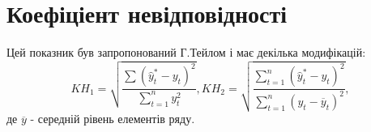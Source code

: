 \documentclass[a4paper, fontsize=10pt, oneside]{article}
\begin{document}
\section{Коефіціент невідповідності}

Цей показник був запропонований Г.Тейлом і має декілька модифікацій:
$$KH_{1} = \sqrt{\frac{\sum (\hat{y}^{*}_{t} - y_{t})^2}{\sum\limits_{t=1}^{n} y_{t}^2}}, KH_{2} = \sqrt{\frac{\sum\limits_{t=1}^{n}(\hat{y}^{*}_{t} - y_{t})^2}{\sum\limits_{t=1}^{n}(y_{t} - \overline{y}_{t})^2}},$$
\noindent де $\overline{y}$ - середній рівень елементів ряду.
\end{document}
